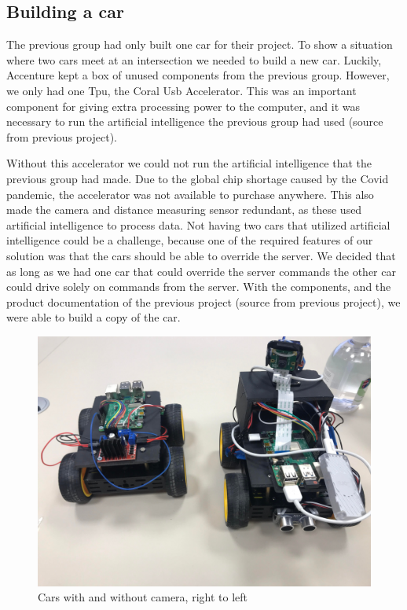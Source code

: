 \subsection{Building a car}
The previous group had only built one car for their project. To show a situation where two cars meet at an intersection we needed to build a new car. Luckily, Accenture kept a box of unused components from the previous group. However, we only had one Tpu, the Coral Usb Accelerator. This was an important component for giving extra processing power to the computer, and it was necessary to run the artificial intelligence the previous group had used (source from previous project). 

Without this accelerator we could not run the artificial intelligence that the previous group had made. Due to the global chip shortage caused by the Covid pandemic, the accelerator was not available to purchase anywhere. This also made the camera and distance measuring sensor redundant, as these used artificial intelligence to process data. Not having two cars that utilized artificial intelligence could be a challenge, because one of the required features of our solution was that the cars should be able to override the server. We decided that as long as we had one car that could override the server commands the other car could drive solely on commands from the server. With the components, and the product documentation of the previous project (source from previous project), we were able to build a copy of the car.

\begin{figure}[h!]
	\centering
	\includegraphics[width=1\linewidth]{figures/two_cars}
	\caption[scrum process]{Cars with and without camera, right to left}
	\label{fig:twocars}
\end{figure}



